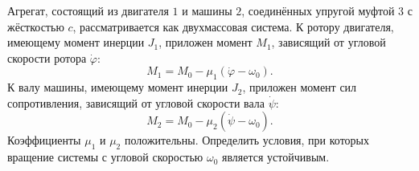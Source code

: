 Агрегат, состоящий из двигателя $1$ и машины $2$,
соединённых упругой муфтой $3$ с жёсткостью $c$,
рассматривается как двухмассовая система.
К ротору двигателя, имеющему момент инерции $J_1$,
приложен момент $M_1$, зависящий от угловой скорости ротора $\dot{\varphi}$:
$$M_1 = M_0 - \mu _1(\dot{\varphi} - \omega _0).$$
К валу машины, имеющему момент инерции $J_2$, приложен момент сил сопротивления,
зависящий от угловой скорости вала $\dot{\psi}$:
$$M_2 = M_0 - \mu _2(\dot{\psi} - \omega _0).$$
Коэффициенты $\mu _1$ и $\mu _2$ положительны.
Определить условия, при которых вращение системы с угловой скоростью
$\omega _0$ является устойчивым.
